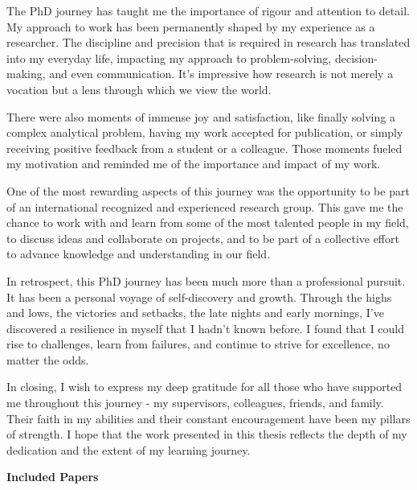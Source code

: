 The PhD journey has taught me the importance of rigour and attention to detail. My approach to work has been permanently shaped by my experience as a researcher. The discipline and precision that is required in research has translated into my everyday life, impacting my approach to problem-solving, decision-making, and even communication. It's impressive how research is not merely a vocation but a lens through which we view the world.

There were also moments of immense joy and satisfaction, like finally solving a complex analytical problem, having my work accepted for publication, or simply receiving positive feedback from a student or a colleague. Those moments fueled my motivation and reminded me of the importance and impact of my work.

One of the most rewarding aspects of this journey was the opportunity to be part of an international recognized and experienced research group. This gave me the chance to work with and learn from some of the most talented people in my field, to discuss ideas and collaborate on projects, and to be part of a collective effort to advance knowledge and understanding in our field.

In retrospect, this PhD journey has been much more than a professional pursuit. It has been a personal voyage of self-discovery and growth. Through the highs and lows, the victories and setbacks, the late nights and early mornings, I've discovered a resilience in myself that I hadn't known before. I found that I could rise to challenges, learn from failures, and continue to strive for excellence, no matter the odds.

In closing, I wish to express my deep gratitude for all those who have supported me throughout this journey - my supervisors, colleagues, friends, and family. Their faith in my abilities and their constant encouragement have been my pillars of strength. I hope that the work presented in this thesis reflects the depth of my dedication and the extent of my learning journey.

\newpage

\textsf{\textbf{\Large{Included Papers}}}

\vspace{2cm}


